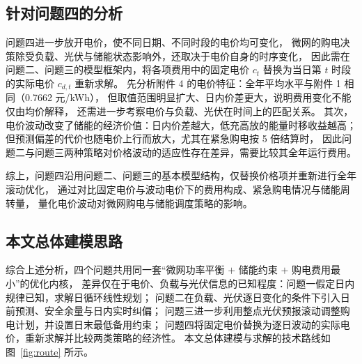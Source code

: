 \subsection{针对问题四的分析}
问题四进一步放开电价，使不同日期、不同时段的电价均可变化，
微网的购电决策除受负载、光伏与储能状态影响外，还取决于电价自身的时序变化，
因此需在问题二、问题三的模型框架内，将各项费用中的固定电价 $c_t$ 替换为当日第 $t$ 时段的实际电价 $c_{d,t}$ 重新求解。
先分析附件 4 的电价特征：全年平均水平与附件 1 相同（0.7662 元/kWh），
但取值范围明显扩大、日内价差更大，说明费用变化不能仅由均价解释，
还需进一步考察电价与负载、光伏在时间上的匹配关系。
其次，电价波动改变了储能的经济价值：日内价差越大，低充高放的能量时移收益越高；
但预测偏差的代价也随电价上行而放大，尤其在紧急购电按 5 倍结算时，
因此问题二与问题三两种策略对价格波动的适应性存在差异，需要比较其全年运行费用。


综上，问题四沿用问题二、问题三的基本模型结构，仅替换价格项并重新进行全年滚动优化，
通过对比固定电价与波动电价下的费用构成、紧急购电情况与储能周转量，
量化电价波动对微网购电与储能调度策略的影响。

\subsection{本文总体建模思路}
综合上述分析，四个问题共用同一套“微网功率平衡 $+$ 储能约束 $+$ 购电费用最小”的优化内核，
差异仅在于电价、负载与光伏信息的已知程度：问题一假定日内规律已知，求解日循环线性规划；
问题二在负载、光伏逐日变化的条件下引入日前预测、安全余量与日内实时纠偏；
问题三进一步利用整点光伏预报滚动调整购电计划，并设置日末最低备用约束；
问题四将固定电价替换为逐日波动的实际电价，重新求解并比较两类策略的经济性。
本文总体建模与求解的技术路线如图~\ref{fig:route} 所示。

